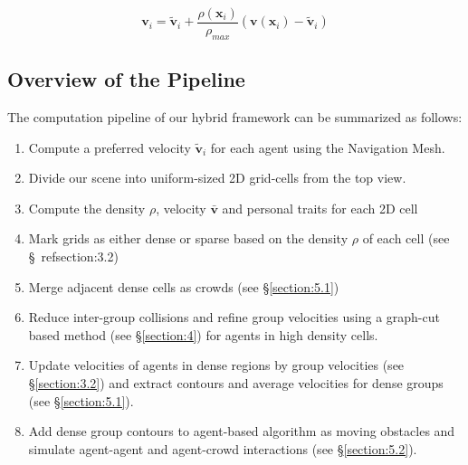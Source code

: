 \documentclass[conference]{acmsiggraph}
\begin{document}
\begin{equation}
\label{eq:6}
\textbf{v}_i = \tilde{\textbf{v}}_i + \frac{\rho(\textbf{x}_i)}{\rho_{max}}(\textbf{v}(\textbf{x}_i) - \tilde{\textbf{v}}_i)
\end{equation}

\subsection{Overview of the Pipeline}
\label{section:3.3}
The computation pipeline of our hybrid framework can be summarized as follows:
\begin{enumerate}
\item Compute a preferred velocity $\tilde{\textbf{v}}_i$ for each agent using the Navigation Mesh.
\item Divide our scene into uniform-sized 2D grid-cells from the top view.
\item Compute the density $\rho$, velocity $\bar{\textbf{v}}$ and personal traits for each 2D cell
\item Mark grids as either dense or sparse based on the density $\rho$ of each cell (see \S\ ref{section:3.2})
\item Merge adjacent dense cells as crowds (see \S\ref{section:5.1})
\item Reduce inter-group collisions and refine group velocities using a graph-cut based method (see \S\ref{section:4}) for agents in high density cells.
\item Update velocities of agents in dense regions by group velocities (see \S\ref{section:3.2}) and extract contours and average velocities for dense groups (see \S\ref{section:5.1}).
\item Add dense group contours to agent-based algorithm as moving obstacles and simulate agent-agent and agent-crowd interactions (see \S\ref{section:5.2}).
\end{enumerate}
\end{document}
